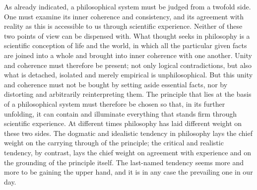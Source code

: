 \documentclass[12pt]{book}
\newcommand{\opage}[1]{\marginnote{\footnotesize\textit{[#1]}}}
\begin{document}
As already indicated, a philosophical system must be judged from a twofold side.
One must examine its inner coherence and consistency, and its agreement with
reality as this is accessible to us through scientific experience. Neither of
these two points of view can be dispensed with. What thought seeks in philosophy
is a scientific conception of life and the world, in which all the particular given
facts are joined into a whole and brought into inner coherence with one another.
Unity and coherence must therefore be present; not only logical contradictions, but
also what is detached, isolated and merely empirical is unphilosophical. But this
unity and coherence must not be bought by setting aside essential facts, nor by
distorting and arbitrarily reinterpreting them. The principle that lies at the basis
of a philosophical system must therefore be chosen so that, in its further
unfolding, it can contain and illuminate everything that stands firm through
scientific experience. At different \opage{5}times philosophy has laid different
weight on these two sides. The dogmatic and idealistic tendency in philosophy lays
the chief weight on the carrying through of the principle; the critical and
realistic tendency, by contrast, lays the chief weight on agreement with experience
and on the grounding of the principle itself. The last-named tendency seems more
and more to be gaining the upper hand, and it is in any case the prevailing one in
our day.
\end{document}
